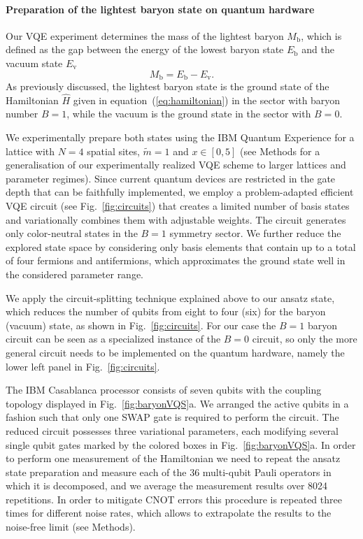 \documentclass[twocolumn,aps,showpacs,prb,superscriptaddress,floatfix,10pt,nofootinbib]{revtex4-2}
\renewcommand{\eqref}[1]{equation~(\ref{#1})}
\begin{document}
\paragraph{\textbf{Preparation of the lightest baryon state on quantum hardware}}
Our VQE experiment determines the mass of the lightest baryon $M_{\text{b}}$, which is defined as the gap between the energy of the lowest baryon state $ E_\text{b}$ and the vacuum state $E_\text{v}$
\begin{equation}
    M_{\text{b}} = E_\text{b} - E_\text{v}.
\end{equation}
As previously discussed, the lightest baryon state is the ground state of the Hamiltonian $\hat{H}$ given in \eqref{eq:hamiltonian} in the sector with baryon number $B=1$, while the vacuum is the ground state in the sector with $B = 0$.

We experimentally prepare both states using the IBM Quantum Experience \cite{IBM_casablanca} for a lattice with $N = 4$ spatial sites, $\tilde{m} = 1$ and $x \in [0,5]$ (see Methods for a generalisation of our experimentally realized VQE scheme to larger lattices and parameter regimes). Since current quantum devices are restricted in the gate depth that can be faithfully implemented, we employ a problem-adapted efficient VQE circuit (see Fig.~\ref{fig:circuits}) that creates a limited number of basis states and variationally combines them with adjustable weights. The circuit generates only color-neutral states in the $B = 1$ symmetry sector. We further reduce the explored state space by considering only basis elements that contain up to a total of four fermions and antifermions, which approximates the ground state well in the considered parameter range. 


We apply the circuit-splitting technique explained above to our ansatz state, which reduces the number of qubits from eight to four (six) for the baryon (vacuum) state, as shown in Fig.~\ref{fig:circuits}. For our case the $B=1$ baryon circuit can be seen as a specialized instance of the $B=0$ circuit, so only the more general circuit needs to be implemented on the quantum hardware, namely the lower left panel in Fig.~\ref{fig:circuits}.

The IBM Casablanca processor \cite{IBM_casablanca} consists of seven qubits with the coupling topology displayed in Fig.~\ref{fig:baryonVQS}a. We arranged the active qubits in a fashion such that only one SWAP gate is required to perform the circuit.
The reduced circuit possesses three variational parameters, each modifying several single qubit gates marked by the colored boxes in Fig.~\ref{fig:baryonVQS}a. In order to perform one measurement of the Hamiltonian we need to repeat the ansatz state preparation and measure each of the 36 multi-qubit Pauli operators in which it is decomposed, and we average the measurement results over 8024 repetitions. In order to mitigate CNOT errors this procedure is repeated three times for different noise rates, which allows to extrapolate the results to the noise-free limit (see Methods).
\end{document}
